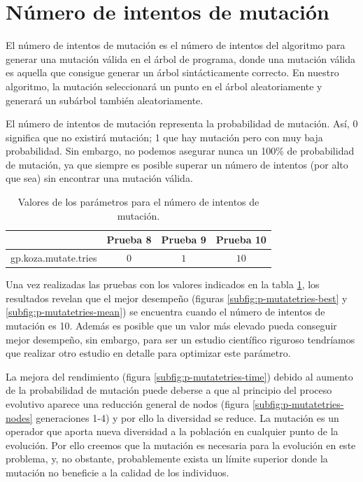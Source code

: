\section{Número de intentos de mutación}\label{sec:p-intentos-mutacion}

El número de intentos de mutación es el número de intentos del algoritmo para
generar una mutación válida en el árbol de programa, donde una mutación válida es
aquella que consigue generar un árbol sintácticamente correcto. En nuestro
algoritmo, la mutación seleccionará un punto en el árbol aleatoriamente y
generará un subárbol también aleatoriamente.

El número de intentos de mutación representa la probabilidad de mutación. Así, 0
significa que no existirá mutación; 1 que hay mutación pero con muy baja
probabilidad. Sin embargo, no podemos asegurar nunca un 100\% de probabilidad de
mutación, ya que siempre es posible superar un número de intentos (por alto que
sea) sin encontrar una mutación válida.

\begin{table}[tb]
\caption{Valores de los parámetros para el número de intentos de mutación.}
\label{tab:mutate-tries}
\centering
\begin{tabular}{lccc}
\toprule
  &\textbf{Prueba 8} & \textbf{Prueba 9} & \textbf{Prueba 10}\\
\midrule
gp.koza.mutate.tries & $0$ &  $1$  & $10$ \\
\bottomrule
\end{tabular}
\end{table}

Una vez realizadas las pruebas con los valores indicados en la tabla
\ref{tab:mutate-tries}, los resultados revelan que el mejor desempeño (figuras
\ref{subfig:p-mutatetries-best} y \ref{subfig:p-mutatetries-mean}) se encuentra
cuando el número de intentos de mutación es 10. Además es posible que un valor
más elevado pueda conseguir mejor desempeño, sin embargo, para ser un estudio
científico riguroso tendríamos que realizar otro estudio en detalle para
optimizar este parámetro.

La mejora del rendimiento (figura \ref{subfig:p-mutatetries-time}) debido al
aumento de la probabilidad de mutación puede deberse a que al principio del proceso evolutivo aparece una reducción general de
nodos (figura \ref{subfig:p-mutatetries-nodes} generaciones 1-4) y por ello la
diversidad se reduce. La mutación  es un operador que aporta nueva diversidad a
la población en cualquier punto de la evolución. Por ello creemos que la mutación
es necesaria para la evolución en este problema, y, no obstante, probablemente
exista un límite superior donde la mutación no beneficie a la calidad de los
individuos.

